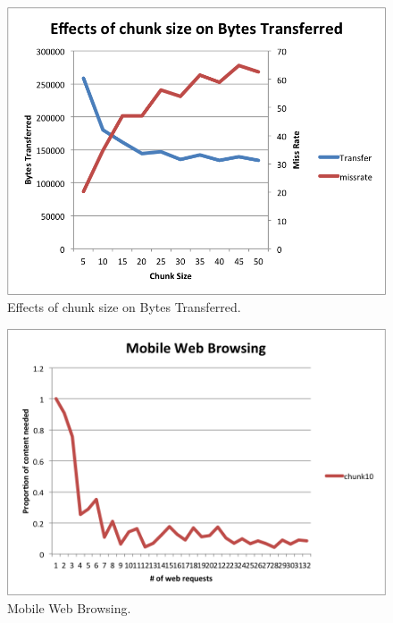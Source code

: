 \begin{figure}[h] 
\centering \includegraphics[width=\columnwidth]{images/chunksize2.png}
\caption{Effects of chunk size on Bytes Transferred.}
\label{fig:percent_bytes}
\end{figure}

\begin{figure}[h] 
\centering \includegraphics[width=\columnwidth]{images/browsing.png}
\caption{Mobile Web Browsing.}
\label{fig:mob_browsing}
\end{figure}

